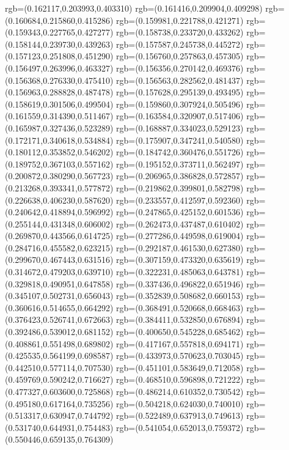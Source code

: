 {{{			rgb=(0.162117,0.203993,0.403310)
			rgb=(0.161416,0.209904,0.409298)
			rgb=(0.160684,0.215860,0.415286)
			rgb=(0.159981,0.221788,0.421271)
			rgb=(0.159343,0.227765,0.427277)
			rgb=(0.158738,0.233720,0.433262)
			rgb=(0.158144,0.239730,0.439263)
			rgb=(0.157587,0.245738,0.445272)
			rgb=(0.157123,0.251808,0.451290)
			rgb=(0.156760,0.257863,0.457305)
			rgb=(0.156497,0.263996,0.463327)
			rgb=(0.156356,0.270142,0.469376)
			rgb=(0.156368,0.276330,0.475410)
			rgb=(0.156563,0.282562,0.481437)
			rgb=(0.156963,0.288828,0.487478)
			rgb=(0.157628,0.295139,0.493495)
			rgb=(0.158619,0.301506,0.499504)
			rgb=(0.159860,0.307924,0.505496)
			rgb=(0.161559,0.314390,0.511467)
			rgb=(0.163584,0.320907,0.517406)
			rgb=(0.165987,0.327436,0.523289)
			rgb=(0.168887,0.334023,0.529123)
			rgb=(0.172171,0.340618,0.534884)
			rgb=(0.175907,0.347241,0.540580)
			rgb=(0.180112,0.353852,0.546202)
			rgb=(0.184742,0.360476,0.551726)
			rgb=(0.189752,0.367103,0.557162)
			rgb=(0.195152,0.373711,0.562497)
			rgb=(0.200872,0.380290,0.567723)
			rgb=(0.206965,0.386828,0.572857)
			rgb=(0.213268,0.393341,0.577872)
			rgb=(0.219862,0.399801,0.582798)
			rgb=(0.226638,0.406230,0.587620)
			rgb=(0.233557,0.412597,0.592360)
			rgb=(0.240642,0.418894,0.596992)
			rgb=(0.247865,0.425152,0.601536)
			rgb=(0.255144,0.431348,0.606002)
			rgb=(0.262473,0.437487,0.610402)
			rgb=(0.269870,0.443566,0.614725)
			rgb=(0.277286,0.449598,0.619004)
			rgb=(0.284716,0.455582,0.623215)
			rgb=(0.292187,0.461530,0.627380)
			rgb=(0.299670,0.467443,0.631516)
			rgb=(0.307159,0.473320,0.635619)
			rgb=(0.314672,0.479203,0.639710)
			rgb=(0.322231,0.485063,0.643781)
			rgb=(0.329818,0.490951,0.647858)
			rgb=(0.337436,0.496822,0.651946)
			rgb=(0.345107,0.502731,0.656043)
			rgb=(0.352839,0.508682,0.660153)
			rgb=(0.360616,0.514655,0.664292)
			rgb=(0.368491,0.520668,0.668463)
			rgb=(0.376423,0.526741,0.672663)
			rgb=(0.384411,0.532850,0.676894)
			rgb=(0.392486,0.539012,0.681152)
			rgb=(0.400650,0.545228,0.685462)
			rgb=(0.408861,0.551498,0.689802)
			rgb=(0.417167,0.557818,0.694171)
			rgb=(0.425535,0.564199,0.698587)
			rgb=(0.433973,0.570623,0.703045)
			rgb=(0.442510,0.577114,0.707530)
			rgb=(0.451101,0.583649,0.712058)
			rgb=(0.459769,0.590242,0.716627)
			rgb=(0.468510,0.596898,0.721222)
			rgb=(0.477327,0.603600,0.725868)
			rgb=(0.486214,0.610352,0.730542)
			rgb=(0.495180,0.617164,0.735256)
			rgb=(0.504218,0.624030,0.740010)
			rgb=(0.513317,0.630947,0.744792)
			rgb=(0.522489,0.637913,0.749613)
			rgb=(0.531740,0.644931,0.754483)
			rgb=(0.541054,0.652013,0.759372)
			rgb=(0.550446,0.659135,0.764309)
}}}
